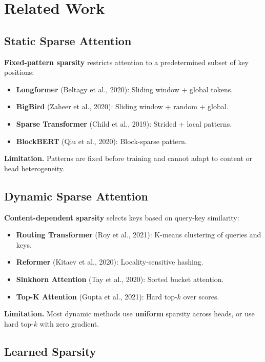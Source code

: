 
\section{Related Work}

\subsection{Static Sparse Attention}

\textbf{Fixed-pattern sparsity} restricts attention to a predetermined subset of 
key positions:

\begin{itemize}
\item \textbf{Longformer} (Beltagy et al., 2020): Sliding window + global tokens.
\item \textbf{BigBird} (Zaheer et al., 2020): Sliding window + random + global.
\item \textbf{Sparse Transformer} (Child et al., 2019): Strided + local patterns.
\item \textbf{BlockBERT} (Qiu et al., 2020): Block-sparse pattern.

\end{itemize}
\textbf{Limitation.} Patterns are fixed before training and cannot adapt to 
content or head heterogeneity.

\subsection{Dynamic Sparse Attention}

\textbf{Content-dependent sparsity} selects keys based on query-key similarity:

\begin{itemize}
\item \textbf{Routing Transformer} (Roy et al., 2021): K-means clustering of queries
  and keys.
\item \textbf{Reformer} (Kitaev et al., 2020): Locality-sensitive hashing.
\item \textbf{Sinkhorn Attention} (Tay et al., 2020): Sorted bucket attention.
\item \textbf{Top-K Attention} (Gupta et al., 2021): Hard top-$k$ over scores.

\end{itemize}
\textbf{Limitation.} Most dynamic methods use \textbf{uniform} sparsity across heads, 
or use hard top-$k$ with zero gradient.

\subsection{Learned Sparsity}

